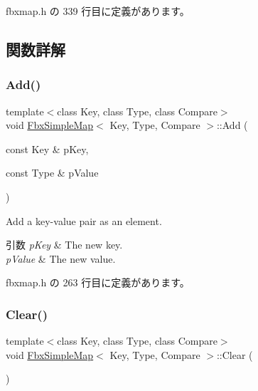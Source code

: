 fbxmap.\+h の 339 行目に定義があります。



\subsection{関数詳解}
\mbox{\label{class_fbx_simple_map_aff95473f35a67022ef78d6b81f72670b}} 
\subsubsection{\texorpdfstring{Add()}{Add()}}
{\footnotesize\ttfamily template$<$class Key, class Type, class Compare$>$ \\
void \hyperlink{class_fbx_simple_map}{Fbx\+Simple\+Map}$<$ Key, Type, Compare $>$\+::Add (\begin{DoxyParamCaption}\item[{const Key \&}]{p\+Key,  }\item[{const Type \&}]{p\+Value }\end{DoxyParamCaption})\hspace{0.3cm}{\ttfamily [inline]}}

Add a key-\/value pair as an element. 
\begin{DoxyParams}{引数}
{\em p\+Key} & The new key. \\
\hline
{\em p\+Value} & The new value. \\
\hline
\end{DoxyParams}


 fbxmap.\+h の 263 行目に定義があります。

\mbox{\label{class_fbx_simple_map_abd94eb8a48a52594555d6818515b1a06}} 
\subsubsection{\texorpdfstring{Clear()}{Clear()}}
{\footnotesize\ttfamily template$<$class Key, class Type, class Compare$>$ \\
void \hyperlink{class_fbx_simple_map}{Fbx\+Simple\+Map}$<$ Key, Type, Compare $>$\+::Clear (\begin{DoxyParamCaption}{ }\end{DoxyParamCaption})\hspace{0.3cm}{\ttfamily [inline]}}



